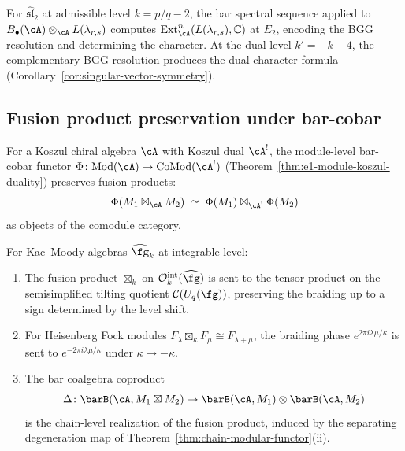 \begin{remark}
\label{rem:admissible-bar-ss}
For $\widehat{\mathfrak{sl}}_2$ at admissible level $k = p/q - 2$, the bar spectral sequence applied to $B_\bullet(\cA) \otimes_\cA L(\lambda_{r,s})$ computes $\mathrm{Ext}^n_\cA(L(\lambda_{r,s}), \mathbb{C})$ at $E_2$, encoding the BGG resolution and determining the character.  At the dual level $k' = -k - 4$, the complementary BGG resolution produces the dual character formula (Corollary~\ref{cor:singular-vector-symmetry}).
\end{remark}

\subsection{Fusion product preservation under bar-cobar}
\label{subsec:fusion-bar-cobar}

\begin{theorem}\label{thm:fusion-bar-cobar}
For a Koszul chiral algebra $\cA$ with Koszul dual $\cA^!$,
the module-level bar-cobar functor
$\Phi\colon \mathrm{Mod}(\cA) \to \mathrm{CoMod}(\cA^!)$
\textup{(}Theorem~\textup{\ref{thm:e1-module-koszul-duality})}
preserves fusion products:
\begin{equation}\label{eq:fusion-preservation}
\Phi(M_1 \boxtimes_\cA M_2) \;\simeq\;
\Phi(M_1) \boxtimes_{\cA^!} \Phi(M_2)
\end{equation}
as objects of the comodule category.

For Kac--Moody algebras $\widehat{\fg}_k$ at integrable level:
\begin{enumerate}[label=\textup{(\roman*)}]
\item The fusion product $\boxtimes_k$ on
  $\mathcal{O}_k^{\mathrm{int}}(\widehat{\fg})$ is sent to
  the tensor product on the semisimplified tilting quotient
  $\mathcal{C}(U_q(\fg))$, preserving the braiding up to a sign
  determined by the level shift.
\item For Heisenberg Fock modules $F_\lambda \boxtimes_\kappa
  F_\mu \cong F_{\lambda+\mu}$, the braiding phase
  $e^{2\pi i \lambda\mu/\kappa}$ is sent to
  $e^{-2\pi i \lambda\mu/\kappa}$ under $\kappa \mapsto -\kappa$.
\item The bar coalgebra coproduct
  \begin{equation}\label{eq:bar-coproduct-fusion}
  \Delta\colon \barB(\cA, M_1 \boxtimes M_2) \to
  \barB(\cA, M_1) \otimes \barB(\cA, M_2)
  \end{equation}
  is the chain-level realization of the fusion product, induced by
  the separating degeneration map of
  Theorem~\textup{\ref{thm:chain-modular-functor}(ii)}.
\end{enumerate}
\end{theorem}

